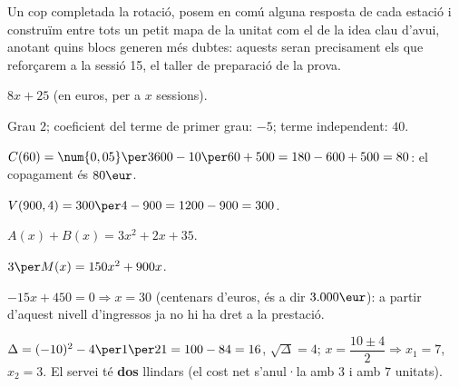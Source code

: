\bigskip
\noindent Un cop completada la rotació, posem en comú alguna resposta de
cada estació i construïm entre tots un petit mapa de la unitat com el de
la idea clau d'avui, anotant quins blocs generen més dubtes: aquests
seran precisament els que reforçarem a la sessió 15, el taller de
preparació de la prova.

\begin{solucions}
\begin{sollist}
  \item $8x+25$ (en euros, per a $x$ sessions).
  \item Grau $2$; coeficient del terme de primer grau: $-5$; terme
        independent: $40$.
  \item $C(60)=\num{0,05}\per3600-10\per60+500=180-600+500=80$: el
        copagament és $80\eur$.
  \item $V(900,4)=300\per4-900=1200-900=300$.
  \item $A(x)+B(x)=3x^2+2x+35$.
  \item $3\per M(x)=150x^2+900x$.
  \item $-15x+450=0 \Rightarrow x=30$ (centenars d'euros, és a dir
        $3.000\eur$): a partir d'aquest nivell d'ingressos ja no hi ha
        dret a la prestació.
  \item $\Delta=(-10)^2-4\per1\per21=100-84=16$, $\sqrt{\Delta}=4$;
        $x=\dfrac{10\pm4}{2} \Rightarrow x_1=7$, $x_2=3$. El servei té
        \textbf{dos} llindars (el cost net s'anul·la amb $3$ i amb $7$
        unitats).
\end{sollist}
\end{solucions}
